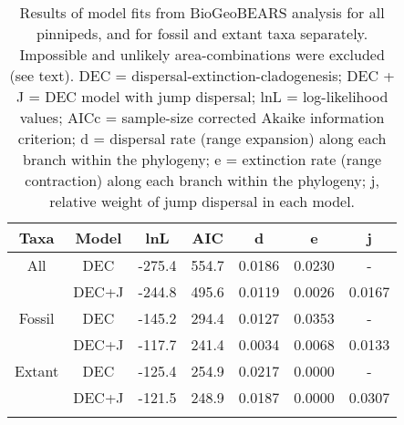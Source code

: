 \begin{longtable}{ccccccc}

\caption{Results of model fits from BioGeoBEARS analysis for all pinnipeds, and for fossil and extant taxa separately. Impossible and unlikely area-combinations were excluded (see text). DEC = dispersal-extinction-cladogenesis; DEC + J = DEC model with jump dispersal; lnL = log-likelihood values; AICc = sample-size corrected Akaike information criterion; d = dispersal rate (range expansion) along each branch within the phylogeny; e = extinction rate (range contraction) along each branch within the phylogeny; j, relative weight of jump dispersal in each model.
}\\

\hline
\textbf{Taxa} & 
\textbf{Model} &
\textbf{lnL} &
\textbf{AIC} &
\textbf{d}&
\textbf{e} &
\textbf{j}\\
\hline
All &
DEC &
-275.4 &
554.7 &
0.0186 &
0.0230 &
-\\

 &
DEC+J &
-244.8 &
495.6 &
0.0119 &
0.0026 &
0.0167\\

Fossil &
DEC &
-145.2 &
294.4 &
0.0127 &
0.0353 &
-\\

 &
DEC+J &
-117.7 &
241.4 &
0.0034 &
0.0068 &
0.0133 \\

Extant &
DEC &
-125.4 &
254.9 &
0.0217 &
0.0000 &
-\\

 &
DEC+J &
-121.5 &
248.9 &
0.0187 &
0.0000 &
0.0307\\
\hline

\label{table-unlikely}
\end{longtable}